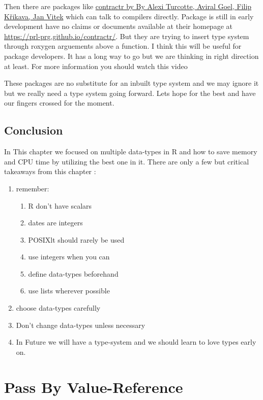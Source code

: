 \documentclass[
]{book}
\begin{document}
Then there are packages like \href{https://github.com/PRL-PRG/contractr}{contractr by By Alexi Turcotte, Aviral Goel, Filip Křikava, Jan Vitek} which can talk to compilers directly. Package is still in early development have no claims or documents available at their homepage at \url{https://prl-prg.github.io/contractr/}. But they are trying to insert type system through roxygen arguements above a function. I think this will be useful for package developers. It has a long way to go but we are thinking in right direction at least. For more information you should watch this video

These packages are no substitute for an inbuilt type system and we may ignore it but we really need a type system going forward. Lets hope for the best and have our fingers crossed for the moment.

\hypertarget{conclusion-5}{%
\section{Conclusion}\label{conclusion-5}}

In This chapter we focused on multiple data-types in R and how to save memory and CPU time by utilizing the best one in it. There are only a few but critical takeaways from this chapter :

\begin{enumerate}
\def\labelenumi{\arabic{enumi}.}
\item
  remember:

  \begin{enumerate}
  \def\labelenumii{\arabic{enumii}.}
  \item
    R don't have scalars
  \item
    dates are integers
  \item
    POSIXlt should rarely be used
  \item
    use integers when you can
  \item
    define data-types beforehand
  \item
    use lists wherever possible
  \end{enumerate}
\item
  choose data-types carefully
\item
  Don't change data-types unless necessary
\item
  In Future we will have a type-system and we should learn to love types early on.
\end{enumerate}

\hypertarget{reference}{%
\chapter{Pass By Value-Reference}\label{reference}}
\end{document}
